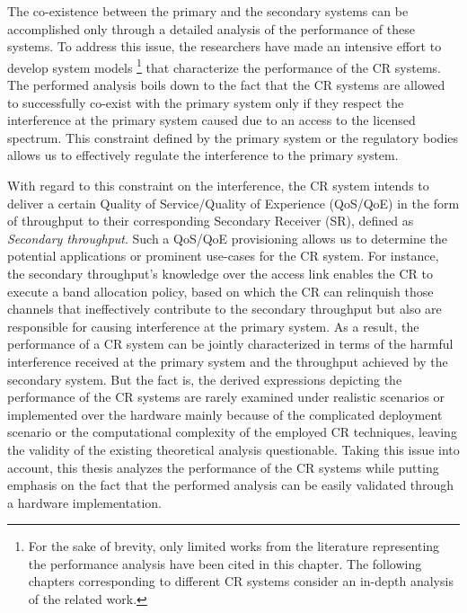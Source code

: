 The co-existence between the primary and the secondary systems can be accomplished only through a detailed analysis of the performance of these systems. %
To address this issue, the researchers have made an intensive effort to develop system models \cite{Liang08, Kang209, Kang09}\footnote{For the sake of brevity, only limited works from the literature representing the performance analysis have been cited in this chapter. The following chapters corresponding to different CR systems consider an in-depth analysis of the related work.} that characterize the performance of the CR systems. The performed analysis boils down to the fact that the CR systems are allowed to successfully co-exist with the primary system only if they respect the interference at the primary system caused due to an access to the licensed spectrum. This constraint defined by the primary system or the regulatory bodies allows us to effectively regulate the interference to the primary system. 

With regard to this constraint on the interference, the CR system intends to deliver a certain Quality of Service/Quality of Experience (QoS/QoE) in the form of throughput to their corresponding Secondary Receiver (SR), defined as \textit{Secondary throughput}. Such a QoS/QoE provisioning allows us to determine the potential applications or prominent use-cases for the CR system. For instance, the secondary throughput's knowledge over the access link enables the CR to execute a band allocation policy, based on which the CR can relinquish those channels that ineffectively contribute to the secondary throughput but also are responsible for causing interference at the primary system. As a result, the performance of a CR system can be jointly characterized in terms of the harmful interference received at the primary system and the throughput achieved by the secondary system. 
But the fact is, the derived expressions depicting the performance of the CR systems are rarely examined under realistic scenarios or implemented over the hardware mainly because of the complicated deployment scenario or the computational complexity of the employed CR techniques, leaving the validity of the existing theoretical analysis questionable. Taking this issue into account, this thesis analyzes the performance of the CR systems while putting emphasis on the fact that the performed analysis can be easily validated through a hardware implementation. 

